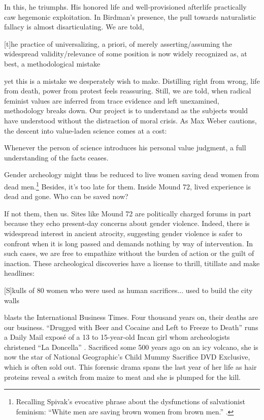 In this, he triumphs. His honored life and well-provisioned afterlife practically caw hegemonic exploitation. In Birdman's presence, the pull towards naturalistic fallacy is almost disarticulating. We are told, \begin{IJSRAquote}{\cite[25]{lawson1999}}[t]he practice of universalizing, a priori, of merely asserting/assuming the widespread validity/relevance of some position is now widely recognized as, at best, a methodological mistake\end{IJSRAquote}yet this is a mistake we desperately wish to make. Distilling right from wrong, life from death, power from protest feels reassuring. Still, we are told, when radical feminist values are inferred from trace evidence and left unexamined, methodology breaks down. Our project is to understand as the subjects would have understood without the distraction of moral crisis. As Max Weber cautions, the descent into value-laden science comes at a cost: 
\begin{IJSRAquote}{\cite[146]{weber1946}}
	Whenever the person of science introduces his personal value judgment, a full understanding of the facts ceases.
\end{IJSRAquote}
	Gender archeology might thus be reduced to live women saving dead women from dead men.\footnote{Recalling Spivak's evocative phrase about the dysfunctions of salvationist feminism: 
	\enquote{White men are saving brown women from brown men.} \parencite[48]{spivak2010}.} 
Besides, it's too late for them. Inside Mound 72, lived experience is dead and gone. Who can be saved now?

If not them, then us. Sites like Mound 72 are politically charged forums in part because they echo present-day concerns about gender violence. Indeed, there is widespread interest in ancient atrocity, suggesting gender violence is safer to confront when it is long passed and demands nothing by way of intervention. In such cases, we are free to empathize without the burden of action or the guilt of inaction. These archeological discoveries have a license to thrill, titillate and make headlines: \begin{IJSRAquote}{\cite[]{osborne2013}}[S]kulls of 80 women who were used as human sacrifices... used to build the city walls\end{IJSRAquote}blasts the International Business Times. Four thousand years on, their deaths are our business. \enquote{Drugged with Beer and Cocaine and Left to Freeze to Death} runs a Daily Mail exposé of a 13 to 15-year-old Incan girl whom archeologists christened \enquote{La Doncella} \parencite[]{macrae2013}. Sacrificed some 500 years ago on an icy volcano, she is now the star of National Geographic's Child Mummy Sacrifice DVD Exclusive, which is often sold out. This forensic drama spans the last year of her life as hair proteins reveal a switch from maize to meat and she is plumped for the kill. 

